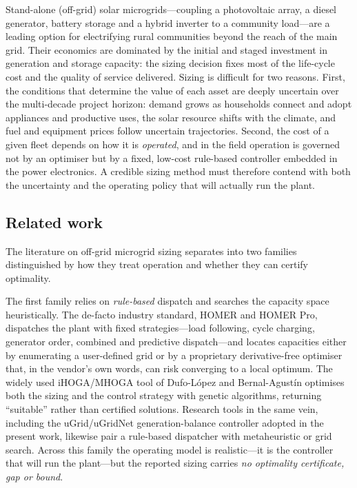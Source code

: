 \documentclass[11pt,a4paper]{article}
\theoremstyle{plain}
\theoremstyle{definition}
\begin{document}
Stand-alone (off-grid) solar microgrids---coupling a photovoltaic array, a diesel
generator, battery storage and a hybrid inverter to a community load---are a leading
option for electrifying rural communities beyond the reach of the main grid. Their
economics are dominated by the initial and staged investment in generation and storage
capacity: the sizing decision fixes most of the life-cycle cost and the quality of
service delivered. Sizing is difficult for two reasons. First, the conditions that
determine the value of each asset are deeply uncertain over the multi-decade project
horizon: demand grows as households connect and adopt appliances and productive uses, the
solar resource shifts with the climate, and fuel and equipment prices follow uncertain
trajectories. Second, the cost of a given fleet depends on how it is \emph{operated}, and
in the field operation is governed not by an optimiser but by a fixed, low-cost
rule-based controller embedded in the power electronics. A credible sizing method must
therefore contend with both the uncertainty and the operating policy that will actually
run the plant.

\subsection{Related work}
\label{sec:relwork}

The literature on off-grid microgrid sizing separates into two families distinguished by
how they treat operation and whether they can certify optimality.

The first family relies on \emph{rule-based} dispatch and searches the capacity space
heuristically. The de-facto industry standard, HOMER and HOMER Pro, dispatches the plant
with fixed strategies---load following, cycle charging, generator order, combined and
predictive dispatch---and locates capacities either by enumerating a user-defined grid or
by a proprietary derivative-free optimiser that, in the vendor's own words, can risk
converging to a local optimum. The widely used iHOGA/MHOGA tool of Dufo-L\'opez and
Bernal-Agust\'in optimises both the sizing and the control strategy with genetic
algorithms, returning ``suitable'' rather than certified solutions. Research tools in the
same vein, including the uGrid/uGridNet generation-balance controller adopted in the
present work, likewise pair a rule-based dispatcher with metaheuristic or grid search.
Across this family the operating model is realistic---it is the controller that will run
the plant---but the reported sizing carries \emph{no optimality certificate, gap or
bound}.
\end{document}
